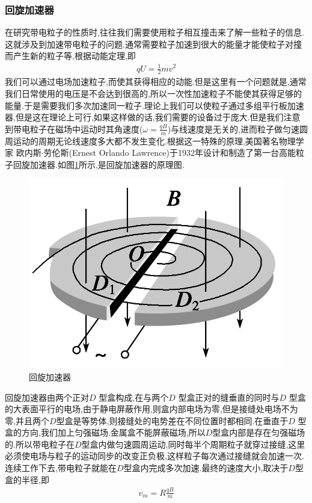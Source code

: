\subsubsection{回旋加速器}

在研究带电粒子的性质时,往往我们需要使用粒子相互撞击来了解一些粒子的信息.这就涉及到加速带电粒子的问题.通常需要粒子加速到很大的能量才能使粒子对撞而产生新的粒子等,根据动能定理,即
\begin{gather}
  qU=\frac{1}{2}mv^2
\end{gather}
我们可以通过电场加速粒子,而使其获得相应的动能.但是这里有一个问题就是,通常我们日常使用的电压是不会达到很高的,所以一次性加速粒子不能使其获得足够的能量.于是需要我们多次加速同一粒子.理论上我们可以使粒子通过多组平行板加速器,但是这在理论上可行,如果这样做的话,我们需要的设备过于庞大.但是我们注意到带电粒子在磁场中运动时其角速度($\omega=\frac{qB}{m}$)与线速度是无关的,进而粒子做匀速圆周运动的周期无论线速度多大都不发生变化.根据这一特殊的原理,美国著名物理学家 欧内斯$\cdot$劳伦斯(Ernest Orlando Lawrence)于1932年设计和制造了第一台高能粒子回旋加速器.如图\ref{fig:huixuanjiasu0}所示,是回旋加速器的原理图.

\begin{figure}[H]
  \centering
  \includegraphics{./cichang/图片8.png}
  \caption{回旋加速器}
  \label{fig:huixuanjiasu0}
\end{figure}

回旋加速器由两个正对$D$ 型盒构成,在与两个$D$ 型盒正对的缝垂直的同时与$D$ 型盒的大表面平行的电场,由于静电屏蔽作用,则盒内部电场为零,但是接缝处电场不为零,并且两个$D$型盒是等势体,则接缝处的电势差在不同位置时都相同.在垂直于$D$ 型盒的方向,我们加上匀强磁场,金属盒不能屏蔽磁场,所以$D$型盒内部是存在匀强磁场的.所以带电粒子在$D$型盒内做匀速圆周运动,同时每半个周期粒子就穿过接缝,这里必须使电场与粒子的运动同步的改变正负极,这样粒子每次通过接缝就会加速一次.连续工作下去,带电粒子就能在$D$型盒内完成多次加速.最终的速度大小,取决于$D$型盒的半径,即
\begin{gather}
  v_m=R\frac{qB}{m} 
\end{gather}

